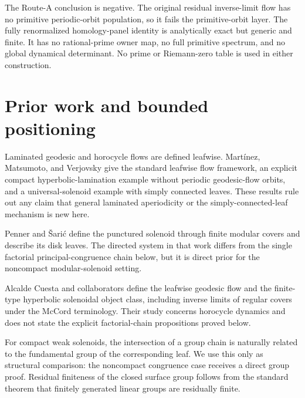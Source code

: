 \documentclass[11pt]{article}
\theoremstyle{definition}
\theoremstyle{remark}
\begin{document}
The Route-A conclusion is negative. The original residual inverse-limit flow has no primitive periodic-orbit population, so it fails the primitive-orbit layer. The fully renormalized homology-panel identity is analytically exact but generic and finite. It has no rational-prime owner map, no full primitive spectrum, and no global dynamical determinant. No prime or Riemann-zero table is used in either construction.

\section{Prior work and bounded positioning}

Laminated geodesic and horocycle flows are defined leafwise. Martínez, Matsumoto, and Verjovsky give the standard leafwise flow framework, an explicit compact hyperbolic-lamination example without periodic geodesic-flow orbits, and a universal-solenoid example with simply connected leaves.
\citep[Section~2.2 and Examples~4, 6]{martinez2016}
These results rule out any claim that general laminated aperiodicity or the simply-connected-leaf mechanism is new here.

Penner and Šarić define the punctured solenoid through finite modular covers and describe its disk leaves.
\citep[Introduction and Definition~2.1]{penner2008}
The directed system in that work differs from the single factorial principal-congruence chain below, but it is direct prior for the noncompact modular-solenoid setting.

Alcalde Cuesta and collaborators define the leafwise geodesic flow and the finite-type hyperbolic solenoidal object class, including inverse limits of regular covers under the McCord terminology.
\citep[Definitions~4, 5, and 7]{alcalde2026}
Their study concerns horocycle dynamics and does not state the explicit factorial-chain propositions proved below.

For compact weak solenoids, the intersection of a group chain is naturally related to the fundamental group of the corresponding leaf.
\citep[Definition~5.5]{hurder2019}
We use this only as structural comparison: the noncompact congruence case receives a direct group proof. Residual finiteness of the closed surface group follows from the standard theorem that finitely generated linear groups are residually finite.
\citep[p.~1]{nica2013}
\end{document}
